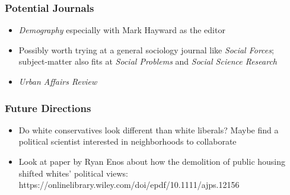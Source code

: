 \documentclass{baderart}
\providecommand{\tightlist}{%
  \setlength{\itemsep}{0pt}\setlength{\parskip}{0pt}}
\begin{document}
\subsubsection{Potential Journals}\label{potential-journals}

\begin{itemize}
\tightlist
\item
  \emph{Demography} especially with Mark Hayward as the editor
\item
  Possibly worth trying at a general sociology journal like \emph{Social
  Forces}; subject-matter also fits at \emph{Social Problems} and
  \emph{Social Science Research}
\item
  \emph{Urban Affairs Review}
\end{itemize}

\subsubsection{Future Directions}\label{future-directions}

\begin{itemize}
\tightlist
\item
  Do white conservatives look different than white liberals? Maybe find
  a political scientist interested in neighborhoods to collaborate
\item
  Look at paper by Ryan Enos about how the demolition of public housing
  shifted whites' political views:
  https://onlinelibrary.wiley.com/doi/epdf/10.1111/ajps.12156
\end{itemize}
\end{document}
